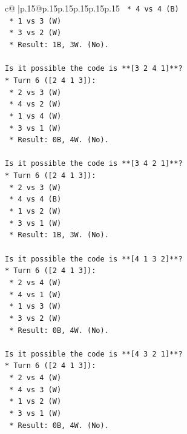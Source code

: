 \documentclass{article}
\begin{document}
{\begin{supertabular}{c@{$\;$}|p{.15\linewidth}@{}p{.15\linewidth}p{.15\linewidth}p{.15\linewidth}p{.15\linewidth}p{.15\linewidth}}
{{{\texttt{    *   4 vs 4 (B)} \\
\texttt{    *   1 vs 3 (W)} \\
\texttt{    *   3 vs 2 (W)} \\
\texttt{    *   Result: 1B, 3W. (No).} \\
\\ 
\texttt{Is it possible the code is **{[}3 2 4 1{]}**?} \\
\texttt{*   Turn 6 ({[}2 4 1 3{]}):} \\
\texttt{    *   2 vs 3 (W)} \\
\texttt{    *   4 vs 2 (W)} \\
\texttt{    *   1 vs 4 (W)} \\
\texttt{    *   3 vs 1 (W)} \\
\texttt{    *   Result: 0B, 4W. (No).} \\
\\ 
\texttt{Is it possible the code is **{[}3 4 2 1{]}**?} \\
\texttt{*   Turn 6 ({[}2 4 1 3{]}):} \\
\texttt{    *   2 vs 3 (W)} \\
\texttt{    *   4 vs 4 (B)} \\
\texttt{    *   1 vs 2 (W)} \\
\texttt{    *   3 vs 1 (W)} \\
\texttt{    *   Result: 1B, 3W. (No).} \\
\\ 
\texttt{Is it possible the code is **{[}4 1 3 2{]}**?} \\
\texttt{*   Turn 6 ({[}2 4 1 3{]}):} \\
\texttt{    *   2 vs 4 (W)} \\
\texttt{    *   4 vs 1 (W)} \\
\texttt{    *   1 vs 3 (W)} \\
\texttt{    *   3 vs 2 (W)} \\
\texttt{    *   Result: 0B, 4W. (No).} \\
\\ 
\texttt{Is it possible the code is **{[}4 3 2 1{]}**?} \\
\texttt{*   Turn 6 ({[}2 4 1 3{]}):} \\
\texttt{    *   2 vs 4 (W)} \\
\texttt{    *   4 vs 3 (W)} \\
\texttt{    *   1 vs 2 (W)} \\
\texttt{    *   3 vs 1 (W)} \\
\texttt{    *   Result: 0B, 4W. (No).} \\
}}}
\end{supertabular}}
\end{document}
